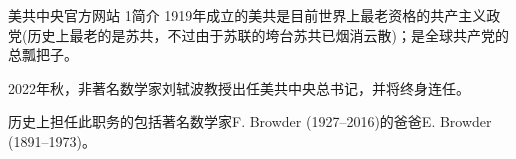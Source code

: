 美共中央官方网站
1简介
1919年成立的美共是目前世界上最老资格的共产主义政党(历史上最老的是苏共，不过由于苏联的垮台苏共已烟消云散)；是全球共产党的总瓢把子。

2022年秋，非著名数学家刘轼波教授出任美共中央总书记，并将终身连任。

历史上担任此职务的包括著名数学家F. Browder (1927–2016)的爸爸E. Browder (1891–1973)。